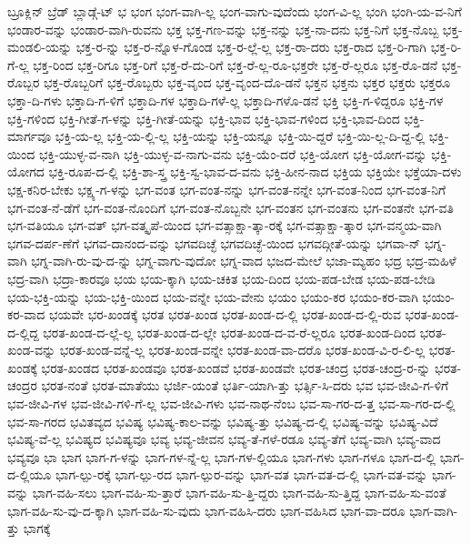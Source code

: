 {ಬ್ರೂಕ್ಲಿನ್
ಬ್ರೆಡ್
ಬ್ಲಾಡ್ಗೆ-ಟ್
ಭ
ಭಂಗ
ಭಂಗ-ವಾಗಿ-ಲ್ಲ
ಭಂಗ-ವಾಗು-ವುದೆಂದು
ಭಂಗ-ವಿ-ಲ್ಲ
ಭಂಗಿ
ಭಂಗಿ-ಯ-ವ-ನಿಗೆ
ಭಂಡಾರ-ವನ್ನು
ಭಂಡಾರ-ವಾಗಿ-ರುವನು
ಭಕ್ತ
ಭಕ್ತ-ಗಣ-ವನ್ನು
ಭಕ್ತ-ನನ್ನು
ಭಕ್ತ-ನಾ-ದನು
ಭಕ್ತ-ನಿಗೆ
ಭಕ್ತ-ನೊಬ್ಬ
ಭಕ್ತ-ಮಂಡಲಿ-ಯನ್ನು
ಭಕ್ತ-ರ-ನ್ನು
ಭಕ್ತ-ರ-ನ್ನೊಳ-ಗೊಂಡ
ಭಕ್ತ-ರ-ಲ್ಲೆ-ಲ್ಲ
ಭಕ್ತ-ರಾ-ದರು
ಭಕ್ತ-ರಾದ
ಭಕ್ತ-ರಿ-ಗಾಗಿ
ಭಕ್ತ-ರಿ-ಗೆ-ಲ್ಲ
ಭಕ್ತ-ರಿಂದ
ಭಕ್ತ-ರಿಗೂ
ಭಕ್ತ-ರಿಗೆ
ಭಕ್ತ-ರೆ-ದು-ರಿಗೆ
ಭಕ್ತ-ರೆ-ಲ್ಲ-ರೂ-ಭಕ್ತರೇ
ಭಕ್ತ-ರೆ-ಲ್ಲರೂ
ಭಕ್ತ-ರೊ-ಡನೆ
ಭಕ್ತ-ರೊಬ್ಬರ
ಭಕ್ತ-ರೊಬ್ಬರಿಗೆ
ಭಕ್ತ-ರೊಬ್ಬರು
ಭಕ್ತ-ವೃಂದ
ಭಕ್ತ-ವೃಂದ-ದೊ-ಡನೆ
ಭಕ್ತನ
ಭಕ್ತನು
ಭಕ್ತರ
ಭಕ್ತರು
ಭಕ್ತರೂ
ಭಕ್ತಾ-ದಿ-ಗಳು
ಭಕ್ತಾದಿ-ಗ-ಳಿಗೆ
ಭಕ್ತಾದಿ-ಗಳ
ಭಕ್ತಾದಿ-ಗಳೆ-ಲ್ಲ
ಭಕ್ತಾದಿ-ಗಳೊ-ಡನೆ
ಭಕ್ತಿ
ಭಕ್ತಿ-ಗ-ಳಿದ್ದರೂ
ಭಕ್ತಿ-ಗಳ
ಭಕ್ತಿ-ಗಳಿಂದ
ಭಕ್ತಿ-ಗೀತೆ-ಗ-ಳನ್ನು
ಭಕ್ತಿ-ಗೀತೆ-ಯನ್ನು
ಭಕ್ತಿ-ಭಾವ
ಭಕ್ತಿ-ಭಾವ-ಗಳಿಂದ
ಭಕ್ತಿ-ಭಾವ-ದಿಂದ
ಭಕ್ತಿ-ಮಾರ್ಗವೂ
ಭಕ್ತಿ-ಯ-ಲ್ಲ
ಭಕ್ತಿ-ಯ-ಲ್ಲಿ-ಲ್ಲ
ಭಕ್ತಿ-ಯನ್ನು
ಭಕ್ತಿ-ಯನ್ನೂ
ಭಕ್ತಿ-ಯಿ-ದ್ದರೆ
ಭಕ್ತಿ-ಯಿ-ಲ್ಲ-ದಿ-ದ್ದ-ಲ್ಲಿ
ಭಕ್ತಿ-ಯಿಂದ
ಭಕ್ತಿ-ಯುಳ್ಳ-ವ-ನಾಗಿ
ಭಕ್ತಿ-ಯುಳ್ಳ-ವ-ನಾಗು-ವನು
ಭಕ್ತಿ-ಯೆಂ-ದರೆ
ಭಕ್ತಿ-ಯೋಗ
ಭಕ್ತಿ-ಯೋಗ-ವನ್ನು
ಭಕ್ತಿ-ಯೋಗದ
ಭಕ್ತಿ-ರೂಪ-ದ-ಲ್ಲಿ
ಭಕ್ತಿ-ಶಾ-ಸ್ತ್ರ
ಭಕ್ತಿ-ಸ್ವ-ಭಾವ-ದ-ವನು
ಭಕ್ತಿ-ಹೀನ-ನಾದ
ಭಕ್ತಿಯ
ಭಕ್ತಿಯೇ
ಭಕ್ತೆಯಾ-ದಳು
ಭಕ್ಷ-ಕನಿರ-ಬೇಕು
ಭಕ್ಷ್ಯ-ಗ-ಳನ್ನು
ಭಗ-ವಂತ
ಭಗ-ವಂತ-ನನ್ನು
ಭಗ-ವಂತ-ನನ್ನೇ
ಭಗ-ವಂತ-ನಿಂದ
ಭಗ-ವಂತ-ನಿಗೆ
ಭಗ-ವಂತ-ನೆ-ಡೆಗೆ
ಭಗ-ವಂತ-ನೊಂದಿಗೆ
ಭಗ-ವಂತ-ನೊಬ್ಬನೇ
ಭಗ-ವಂತನ
ಭಗ-ವಂತನು
ಭಗ-ವಂತನೇ
ಭಗ-ವತಿ
ಭಗ-ವತಿಯೂ
ಭಗ-ವತ್
ಭಗ-ವತ್ಕೃಪೆ-ಯಿಂದ
ಭಗ-ವತ್ಸಾಕ್ಷಾ-ತ್ಕಾ-ರಕ್ಕೆ
ಭಗ-ವತ್ಸಾಕ್ಷಾ-ತ್ಕಾರ
ಭಗ-ವನ್ಮಯ-ವಾಗಿ
ಭಗವ-ದರ್ಪ-ಣೆಗೆ
ಭಗವ-ದಾನಂದ-ವನ್ನು
ಭಗವದಿಚ್ಛೆ
ಭಗವದಿಚ್ಛೆ-ಯಿಂದ
ಭಗವದ್ಗೀತೆ-ಯನ್ನು
ಭಗವಾ-ನ್
ಭಗ್ನ-ವಾಗಿ
ಭಗ್ನ-ವಾಗಿ-ರು-ವು-ದ-ನ್ನು
ಭಗ್ನ-ವಾಗು-ವುದೋ
ಭಗ್ನ-ವಾದ
ಭಜದ-ಮೇಲೆ
ಭಜಾ-ಮ್ಯಹಂ
ಭದ್ರ
ಭದ್ರ-ಮಹಿಳೆ
ಭದ್ರ-ವಾಗಿ
ಭದ್ರಾ-ಕಾರವೂ
ಭಯ
ಭಯ-ಕ್ಕಾಗಿ
ಭಯ-ಚಕಿತ
ಭಯ-ದಿಂದ
ಭಯ-ಪಡ-ಬೇಡ
ಭಯ-ಪಡ-ಬೇಡಿ
ಭಯ-ಭಕ್ತಿ-ಯನ್ನು
ಭಯ-ಭಕ್ತಿ-ಯಿಂದ
ಭಯ-ವನ್ನೇ
ಭಯ-ವೇನು
ಭಯಂ
ಭಯಂ-ಕರ
ಭಯಂ-ಕರ-ವಾಗಿ
ಭಯಂ-ಕರ-ವಾದ
ಭಯವೇ
ಭರ-ಖಂಡಕ್ಕೆ
ಭರತ
ಭರತ-ಖಂಡ
ಭರತ-ಖಂಡ-ದ-ಲ್ಲಿ
ಭರತ-ಖಂಡ-ದ-ಲ್ಲಿ-ರುವ
ಭರತ-ಖಂಡ-ದ-ಲ್ಲಿದ್ದ
ಭರತ-ಖಂಡ-ದ-ಲ್ಲೆ-ಲ್ಲ
ಭರತ-ಖಂಡ-ದ-ಲ್ಲೇ
ಭರತ-ಖಂಡ-ದ-ವ-ರೆ-ಲ್ಲರೂ
ಭರತ-ಖಂಡ-ದಿಂದ
ಭರತ-ಖಂಡ-ವನ್ನು
ಭರತ-ಖಂಡ-ವನ್ನೆ-ಲ್ಲ
ಭರತ-ಖಂಡ-ವನ್ನೇ
ಭರತ-ಖಂಡ-ವಾ-ದರೊ
ಭರತ-ಖಂಡ-ವಿ-ರ-ಲಿ-ಲ್ಲ
ಭರತ-ಖಂಡಕ್ಕೆ
ಭರತ-ಖಂಡದ
ಭರತ-ಖಂಡವೂ
ಭರತ-ಖಂಡವೆ
ಭರತ-ಖಂಡವೇ
ಭರತ-ಚಂದ್ರ
ಭರತ-ಚಂದ್ರ-ರ-ನ್ನು
ಭರತ-ಚಂದ್ರರ
ಭರತ-ನಂತೆ
ಭರತ-ಮಾತೆಯು
ಭರ್ಜಿ-ಯಂತೆ
ಭರ್ತಿ-ಯಾಗಿ-ತ್ತು
ಭರ್ತ್ಸಿ-ಸಿ-ದರು
ಭವ
ಭವ-ಜೀವಿ-ಗ-ಳಿಗೆ
ಭವ-ಜೀವಿ-ಗಳ
ಭವ-ಜೀವಿ-ಗಳಿ-ಗೆ-ಲ್ಲ
ಭವ-ಜೀವಿ-ಗಳು
ಭವ-ನಾಥ-ನೆಂಬ
ಭವ-ಸಾ-ಗರ-ದ-ತ್ತ
ಭವ-ಸಾ-ಗರ-ದ-ಲ್ಲಿ
ಭವ-ಸಾ-ಗರದ
ಭವಿತವ್ಯದ
ಭವಿಷ್ಯ
ಭವಿಷ್ಯ-ಕಾಲ-ವನ್ನು
ಭವಿಷ್ಯ-ತ್ತು
ಭವಿಷ್ಯ-ದ-ಲ್ಲಿ
ಭವಿಷ್ಯ-ವನ್ನು
ಭವಿಷ್ಯ-ವಿದೆ
ಭವಿಷ್ಯ-ವೆ-ಲ್ಲ
ಭವಿಷ್ಯದ
ಭವಿಷ್ಯವೂ
ಭವ್ಯ
ಭವ್ಯ-ಜೀವನ
ಭವ್ಯ-ತೆ-ಗಳೆ-ರಡೂ
ಭವ್ಯ-ತೆಗೆ
ಭವ್ಯ-ವಾಗಿ
ಭವ್ಯ-ವಾದ
ಭವ್ಯವೂ
ಭಾ
ಭಾಗ
ಭಾಗ-ಗ-ಳನ್ನು
ಭಾಗ-ಗಳ-ನ್ನೆ-ಲ್ಲ
ಭಾಗ-ಗಳ-ಲ್ಲಿಯೂ
ಭಾಗ-ಗಳು
ಭಾಗ-ಗಳೂ
ಭಾಗ-ದ-ಲ್ಲಿ
ಭಾಗ-ದ-ಲ್ಲಿಯೂ
ಭಾಗ-ಲ್ಪು-ರಕ್ಕೆ
ಭಾಗ-ಲ್ಪು-ರದ
ಭಾಗ-ಲ್ಪುರ-ವನ್ನು
ಭಾಗ-ವತ
ಭಾಗ-ವತ-ದ-ಲ್ಲಿ
ಭಾಗ-ವತ-ವನ್ನು
ಭಾಗ-ವನ್ನು
ಭಾಗ-ವಹಿ-ಸಲು
ಭಾಗ-ವಹಿ-ಸು-ತ್ತಾರೆ
ಭಾಗ-ವಹಿ-ಸು-ತ್ತಿ-ದ್ದರು
ಭಾಗ-ವಹಿ-ಸು-ತ್ತಿದ್ದ
ಭಾಗ-ವಹಿ-ಸು-ವಂತೆ
ಭಾಗ-ವಹಿ-ಸು-ವು-ದ-ಕ್ಕಾಗಿ
ಭಾಗ-ವಹಿ-ಸು-ವುದು
ಭಾಗ-ವಹಿಸಿ-ದರು
ಭಾಗ-ವಹಿಸಿದ
ಭಾಗ-ವಾ-ದರೂ
ಭಾಗ-ವಾಗಿ-ತ್ತು
ಭಾಗಕ್ಕೆ
}
